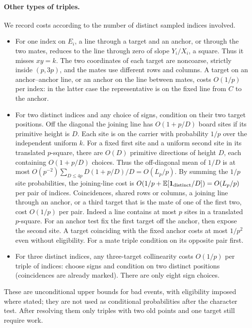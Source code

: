 \paragraph{Other types of triples.} We record costs according to the number of distinct sampled indices involved.
\begin{itemize}
\item For one index on $E_i$, a line through a target and an anchor, or through the two mates, reduces to the line through zero of slope $Y_i/X_i$, a square. Thus it misses $xy=k$. The two coordinates of each target are noncoarse, strictly inside $(p,3p)$, and the mates use different rows and columns. A target on an anchor--anchor line, or an anchor on the line between mates, costs $O(1/p)$ per index: in the latter case the representative is on the fixed line from $C$ to the anchor.
\item For two distinct indices and any choice of signs, condition on their two target positions. Off the diagonal the joining line has $O(1+p/D)$ board sites if its primitive height is $D$. Each site is on the carrier with probability $1/p$ over the independent uniform $k$. For a fixed first site and a uniform second site in its translated $p$-square, there are $O(D)$ primitive directions of height $D$, each containing $O(1+p/D)$ choices. Thus the off-diagonal mean of $1/D$ is at most $O(p^{-2})\sum_{D\le4p} D(1+p/D)/D=O(L_p/p)$. By summing the $1/p$ site probabilities, the joining-line cost is $O(1/p+\mathbb E[\mathbf{1}_{\rm distinct}/D])=O(L_p/p)$ per pair of indices. Coincidences, shared rows or columns, a joining line through an anchor, or a third target that is the mate of one of the first two, cost $O(1/p)$ per pair. Indeed a line contains at most $p$ sites in a translated $p$-square. For an anchor test fix the first target off the anchor, then expose the second site. A target coinciding with the fixed anchor costs at most $1/p^2$ even without eligibility. For a mate triple condition on its opposite pair first.
\item For three distinct indices, any three-target collinearity costs $O(1/p)$ per triple of indices: choose signs and condition on two distinct positions (coincidences are already marked). There are only eight sign choices.
\end{itemize}
These are unconditional upper bounds for bad events, with eligibility imposed where stated; they are not used as conditional probabilities after the character test. After resolving them only triples with two old points and one target still require work.


